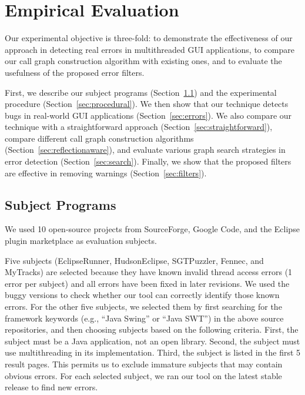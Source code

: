 
\tinystep
\section{Empirical Evaluation}
\label{sec:evaluation}

Our experimental objective is three-fold: to demonstrate the effectiveness
of our approach in detecting real errors in multithreaded GUI applications, to 
compare our call graph construction algorithm
with existing ones, and to evaluate the usefulness of the proposed 
error filters.  

First, we describe our subject programs (Section~\ref{sec:subjects}) and the experimental procedure (Section~\ref{sec:procedural}).
We then show that our technique detects bugs in real-world GUI applications (Section~\ref{sec:errors}).
We also compare our technique with
a straightforward approach (Section~\ref{sec:straightforward}),  compare
different call graph construction algorithms (Section~\ref{sec:reflectionaware}), and
evaluate various graph search strategies in error detection (Section~\ref{sec:search}).
 Finally, we show that the proposed filters are effective
in removing warnings (Section~\ref{sec:filters}). 



\subsection{Subject Programs}
\label{sec:subjects}

We used 10 open-source projects from SourceForge, Google Code,
and the Eclipse plugin marketplace as evaluation subjects. 

Five subjects (EclipseRunner, HudsonEclipse, SGTPuzzler, Fennec, and MyTracks)
are selected because they have known invalid thread access errors (1 error per subject) and
all errors have been fixed in later revisions.
We used the buggy versions to check whether our tool
can correctly identify those known errors. 
For the other five subjects, we selected them
by first searching for the
framework keywords (e.g., ``Java Swing'' or ``Java SWT'')
in the above source repositories, and then choosing subjects based on the following
criteria. First, the subject must be a Java application, not
an open library. Second, the subject must use multithreading in its implementation.
Third, the subject is listed in the first 5 result pages.
This permits us to exclude immature subjects that may contain obvious errors.
For each selected subject, we ran our tool on the latest stable release to find new errors.

